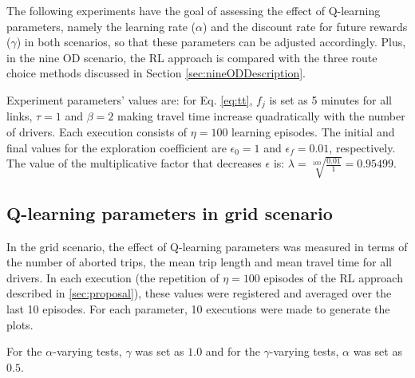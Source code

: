 \documentclass{RITA}
\newcommand{\fftt}{\ensuremath{f_j}} 		%
\newcommand{\numepis}{\ensuremath{\eta}}	%
\begin{document}
The following experiments have the goal of assessing the effect of Q-learning parameters, namely the learning rate ($\alpha$) and the discount rate for future rewards ($\gamma$) in both scenarios, so that these parameters can be adjusted accordingly. Plus, in the nine OD scenario, the RL approach is compared with the three route choice methods discussed in Section \ref{sec:nineODDescription}.

Experiment parameters' values are: for Eq. \eqref{eq:tt}, $\fftt$ is set as 5 minutes for all links, $\tau = 1$ and $\beta = 2$ making travel time increase quadratically with the number of drivers. Each execution consists of $\numepis = 100$ learning episodes. The initial and final values for the exploration coefficient are $\epsilon_0 = 1$ and $\epsilon_f = 0.01$, respectively. The value of the multiplicative factor that decreases $\epsilon$ is: $\lambda = \sqrt[100]{\frac{0.01}{1}} = 0.95499$.


\subsection{Q-learning parameters in grid scenario}


In the grid scenario, the effect of Q-learning parameters was measured in terms of the number of aborted trips, the mean trip length and mean travel time for all drivers. In each execution (the repetition of $\numepis = 100$ episodes of the RL approach described in \ref{sec:proposal}), these values were registered and averaged over the last 10 episodes. For each parameter, 10 executions were made to generate the plots.

For the $\alpha$-varying tests, $\gamma$ was set as $1.0$ and for the $\gamma$-varying tests, $\alpha$ was set as $0.5$.
\end{document}
